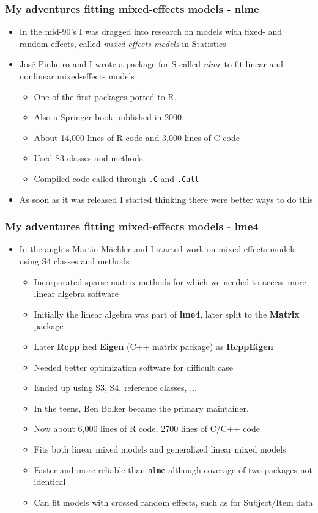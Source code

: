 \documentclass[pdf]{beamer}
\begin{document}
  \begin{frame}\frametitle{My adventures fitting mixed-effects models - nlme}
    \begin{itemize}
      \pause
      \item In the mid-90's I was dragged into research on models with fixed- and random-effects, called \textit{mixed-effects models} in Statistics
      \pause
      \item Jos\'e Pinheiro and I wrote a package for S called \textit{nlme} to fit linear and nonlinear mixed-effects models
      \begin{itemize}
        \pause
        \item One of the first packages ported to R.
        \item Also a Springer book published in 2000.
        \item About 14,000 lines of R code and 3,000 lines of C code
        \item Used S3 classes and methods.
        \item Compiled code called through \texttt{.C} and \texttt{.Call}
      \end{itemize}
      \pause
      \item As soon as it was released I started thinking there were better ways to do this
    \end{itemize}
  \end{frame}

  \begin{frame}\frametitle{My adventures fitting mixed-effects models - lme4}
    \begin{itemize}
      \pause
      \item In the aughts Martin M\"achler and I started work on mixed-effects models using S4 classes and methods
      \begin{itemize}
        \pause
        \item Incorporated sparse matrix methods for which we needed to access more linear algebra software
        \item Initially the linear algebra was part of \textbf{lme4}, later split to the \textbf{Matrix} package
        \item Later \textbf{Rcpp}'ized \textbf{Eigen} (C++ matrix package) as \textbf{RcppEigen}
        \item Needed better optimization software for difficult case
        \item Ended up using S3, S4, reference classes, $\dots$
        \item In the teens, Ben Bolker became the primary maintainer.
        \item Now about 6,000 lines of R code, 2700 lines of C/C++ code
        \item Fits both linear mixed models and generalized linear mixed models
        \item Faster and more reliable than \texttt{nlme} although coverage of two packages not identical
        \item Can fit models with crossed random effects, such as for Subject/Item data
      \end{itemize}
    \end{itemize}
  \end{frame}
\end{document}
